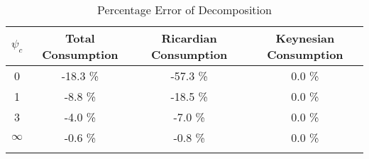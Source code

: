   \begin{table}
\begin{center}
    \caption{Percentage Error of Decomposition}\label{table:error}
\begin{tabular}{cccc}  
$\psi_c$ & Total Consumption & Ricardian Consumption & Keynesian Consumption 
\\ \toprule  
0 & -18.3 \%  & -57.3 \% & 0.0 \% \\ 
1 & -8.8 \%  & -18.5 \% & 0.0 \% \\ 
3 & -4.0 \%  & -7.0 \% & 0.0 \% \\ 
$\infty$ & -0.6 \%  & -0.8 \% & 0.0 \% \\ 
\\ \bottomrule 
 \end{tabular}
\end{center}
\end{table}
